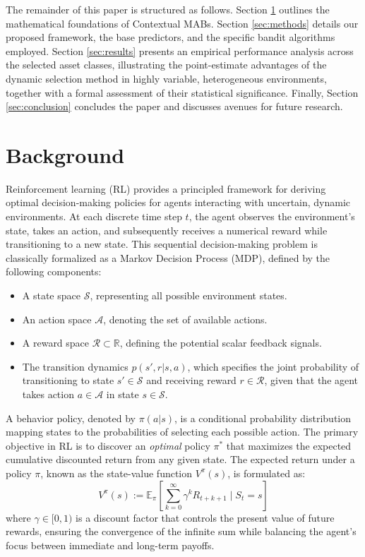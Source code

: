 \documentclass[pdflatex,sn-mathphys-num]{sn-jnl}
\theoremstyle{thmstyleone}%
\theoremstyle{thmstyletwo}%
\theoremstyle{thmstylethree}%
\begin{document}
The remainder of this paper is structured as follows. Section \ref{sec:background} outlines the mathematical foundations of Contextual MABs. Section \ref{sec:methods} details our proposed framework, the base predictors, and the specific bandit algorithms employed. Section \ref{sec:results} presents an empirical performance analysis across the selected asset classes, illustrating the point-estimate advantages of the dynamic selection method in highly variable, heterogeneous environments, together with a formal assessment of their statistical significance. Finally, Section \ref{sec:conclusion} concludes the paper and discusses avenues for future research.

\section{Background}
\label{sec:background}

Reinforcement learning (RL) provides a principled framework for deriving optimal decision-making policies for agents interacting with uncertain, dynamic environments. At each discrete time step $t$, the agent observes the environment's state, takes an action, and subsequently receives a numerical reward while transitioning to a new state. This sequential decision-making problem is classically formalized as a Markov Decision Process (MDP), defined by the following components:
\begin{itemize}
    \item A state space $\mathcal{S}$, representing all possible environment states.
    \item An action space $\mathcal{A}$, denoting the set of available actions.
    \item A reward space $\mathcal{R} \subset \mathbb{R}$, defining the potential scalar feedback signals.
    \item The transition dynamics $p(s', r | s, a)$, which specifies the joint probability of transitioning to state $s' \in \mathcal{S}$ and receiving reward $r \in \mathcal{R}$, given that the agent takes action $a \in \mathcal{A}$ in state $s \in \mathcal{S}$.
\end{itemize}

A behavior policy, denoted by $\pi(a|s)$, is a conditional probability distribution mapping states to the probabilities of selecting each possible action. The primary objective in RL is to discover an \emph{optimal} policy $\pi^*$ that maximizes the expected cumulative discounted return from any given state. The expected return under a policy $\pi$, known as the state-value function $V^\pi(s)$, is formulated as:
\begin{equation}
V^\pi(s) := \mathbb{E}_{\pi}\left[\sum_{k=0}^\infty \gamma^k R_{t+k+1} \;\Bigg|\; S_t = s\right]
\end{equation}
where $\gamma \in [0,1)$ is a discount factor that controls the present value of future rewards, ensuring the convergence of the infinite sum while balancing the agent's focus between immediate and long-term payoffs.
\end{document}
